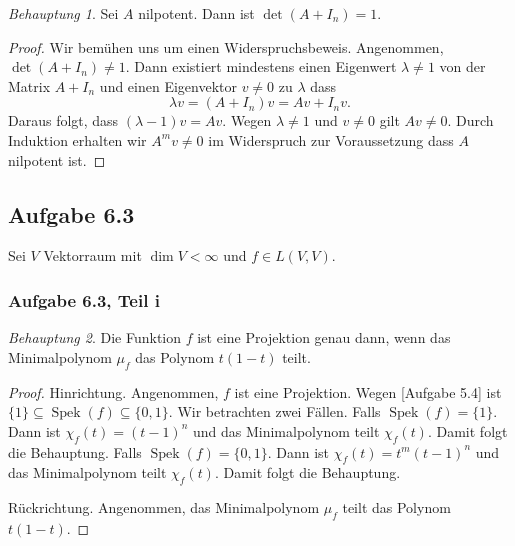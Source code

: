 \documentclass[draft,a5paper]{article}
\theoremstyle{remark}
\newtheorem*{beh}{Behauptung}
\DeclareMathOperator{\Spek}{Spek}
\begin{document}
\begin{beh}
  Sei \(A\) nilpotent.  Dann ist \(\det(A + I_{n}) = 1\).
\end{beh}

\begin{proof}
  Wir bemühen uns um einen Widerspruchsbeweis.  Angenommen,
  \(\det(A+I_{n}) \ne 1\).  Dann existiert mindestens einen Eigenwert
  \(\lambda \ne 1\) von der Matrix \(A+I_{n}\) und einen Eigenvektor
  \(v \ne 0\) zu \(\lambda\) dass
  \[ \lambda v = (A + I_{n}) v = Av + I_{n} v. \] Daraus folgt, dass
  \((\lambda-1)v = Av\).  Wegen \(\lambda \ne 1\) und \(v \ne 0\) gilt
  \(Av \ne 0\).  Durch Induktion erhalten wir \(A^{m}v \ne 0\) im
  Widerspruch zur Voraussetzung dass \(A\) nilpotent ist.
\end{proof}

\subsection*{Aufgabe 6.3}

Sei \(V\) Vektorraum mit \(\dim V < \infty\) und \(f \in L(V, V)\).

\subsubsection*{Aufgabe 6.3, Teil i}

\begin{beh}
  Die Funktion \(f\) ist eine Projektion genau dann, wenn das
  Minimalpolynom \(\mu_{f}\) das Polynom \(t(1-t)\) teilt.
\end{beh}

\begin{proof}
  Hinrichtung.  Angenommen, \(f\) ist eine Projektion.  Wegen [Aufgabe
  5.4] ist \(\{1\} \subseteq \Spek(f) \subseteq \{0, 1\}\).  Wir betrachten zwei
  Fällen.  Falls \(\Spek(f) = \{1\}\).  Dann ist
  \(\chi_{f}(t) = (t-1)^{n}\) und das Minimalpolynom teilt
  \(\chi_{f}(t)\). Damit folgt die Behauptung.  Falls
  \(\Spek(f) = \{0, 1\}\).  Dann ist \(\chi_{f}(t) = t^{m}(t-1)^{n}\) und
  das Minimalpolynom teilt \(\chi_{f}(t)\).  Damit folgt die Behauptung.

  Rückrichtung.  Angenommen, das Minimalpolynom \(\mu_{f}\) teilt das
  Polynom \(t(1-t)\).
\end{proof}
\end{document}
